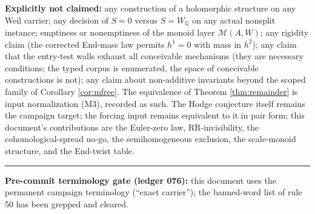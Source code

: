 \documentclass[11pt]{article}
\begin{document}
\textbf{Explicitly not claimed:} any construction of a holomorphic structure on any Weil carrier; any
decision of $S=0$ versus $S=W_\mathbb{Q}$ on any actual nonsplit instance; emptiness or nonemptiness of
the monoid layer $\mathcal{M}(A,W)$; any rigidity claim (the corrected End-mass law permits $h^1=0$ with
mass in $h^2$); any claim that the entry-test walls exhaust all conceivable mechanisms (they are
necessary conditions; the typed corpus is enumerated, the space of conceivable constructions is not);
any claim about non-additive invariants beyond the scoped family of Corollary \ref{cor:mfree}. The
equivalence of Theorem \ref{thm:remainder} is input normalization (M3), recorded as such. The Hodge
conjecture itself remains the campaign target; the forcing input remains equivalent to it in pair form;
this document's contributions are the Euler-zero law, RR-invisibility, the cohomological-spread no-go,
the semihomogeneous exclusion, the scale-monoid structure, and the End-twist table.

\vspace{2mm}
\noindent\rule{\textwidth}{0.4pt}
\vspace{1mm}

\noindent\textbf{Pre-commit terminology gate (ledger 076):} this document uses the permanent campaign
terminology (``exact carrier''); the banned-word list of rule 50 has been grepped and cleared.
\end{document}
